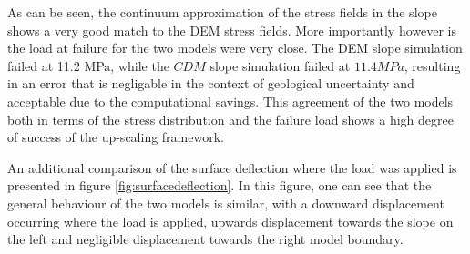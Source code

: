 As can be seen, the continuum approximation of the stress fields in the slope shows a very good match to the DEM stress fields. More importantly however is the load at failure for the two models were very close. The DEM slope simulation failed at 11.2 MPa, while the $CDM$ slope simulation failed at $11.4 MPa$, resulting in an error that is negligable in the context of geological uncertainty and acceptable due to the computational savings. This agreement of the two models both in terms of the stress distribution and the failure load shows a high degree of success of the up-scaling framework. 

An additional comparison of the surface deflection where the load was applied is presented in figure \ref{fig:surfacedeflection}. In this figure, one can see that the general behaviour of the two models is similar, with a downward displacement occurring where the load is applied, upwards displacement towards the slope on the left and negligible displacement towards the right model boundary. 
